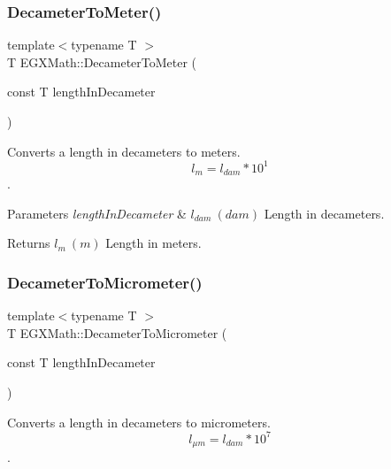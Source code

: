 \subsubsection{\texorpdfstring{Decameter\+To\+Meter()}{DecameterToMeter()}}
{\footnotesize\ttfamily template$<$typename T $>$ \\
T E\+G\+X\+Math\+::\+Decameter\+To\+Meter (\begin{DoxyParamCaption}\item[{const T}]{length\+In\+Decameter }\end{DoxyParamCaption})}



Converts a length in decameters to meters. \[ l_{m}=l_{dam} * 10^{1} \]. 


\begin{DoxyParams}{Parameters}
{\em length\+In\+Decameter} & $ l_{dam}\ (dam)$ Length in decameters. \\
\hline
\end{DoxyParams}
\begin{DoxyReturn}{Returns}
$ l_{m}\ (m)$ Length in meters. 
\end{DoxyReturn}
\mbox{\label{group___e_g_x_math-_conversions-_length_conversions-_decameter-_s_i_gaa5b6d3a32a921345aa1ccb66a8df07c1}} 
\subsubsection{\texorpdfstring{Decameter\+To\+Micrometer()}{DecameterToMicrometer()}}
{\footnotesize\ttfamily template$<$typename T $>$ \\
T E\+G\+X\+Math\+::\+Decameter\+To\+Micrometer (\begin{DoxyParamCaption}\item[{const T}]{length\+In\+Decameter }\end{DoxyParamCaption})}



Converts a length in decameters to micrometers. \[ l_{\mu m}=l_{dam} * 10^{7} \]. 

